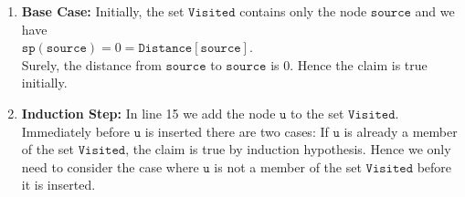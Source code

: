 \begin{enumerate}
\item \textbf{Base Case:}  
      Initially, the set $\texttt{Visited}$ contains only the node $\texttt{source}$ and we have
      \\[0.2cm]
      \hspace*{1.3cm}
      $\texttt{sp}(\texttt{source}) = 0 = \texttt{Distance}[\texttt{source}]$.
      \\[0.2cm]
      Surely, the distance from $\texttt{source}$ to $\texttt{source}$ is $0$.  Hence the claim is true initially.
\item \textbf{Induction Step:}
      In line 15 we add the node $\texttt{u}$ to the set $\texttt{Visited}$.  Immediately before $\texttt{u}$ is
      inserted there are two cases: If $\texttt{u}$ is already a member of the set $\texttt{Visited}$, the
      claim is true by induction hypothesis.  Hence we only need to consider the case where
     $\texttt{u}$ is not a member of the set $\texttt{Visited}$ before it is inserted.


\end{enumerate}
